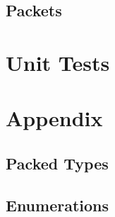 

\subsection{Packets}



\section{Unit Tests}



\section{Appendix}
\subsection{Packed Types}



\subsection{Enumerations}




